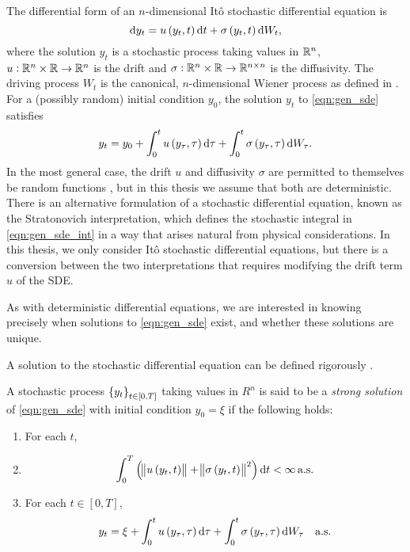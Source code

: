 The differential form of an \(n\)-dimensional It\^o stochastic differential equation is
\begin{equation}
	\dif y_t = u\left(y_t, t\right)\dif t + \sigma\left(y_t, t\right)\dif W_t,
	\label{eqn:gen_sde}
\end{equation}
where the solution \(y_t\) is a stochastic process taking values in \(\mathbb{R}^n\), \(u: \mathbb{R}^n \times \mathbb{R} \to \mathbb{R}^n\) is the drift and \(\sigma: \mathbb{R}^n \times \mathbb{R} \to \mathbb{R}^{n\times n}\) is the diffusivity.
The driving process \(W_t\) is the canonical, \(n\)-dimensional Wiener process as defined in .
For a (possibly random) initial condition \(y_0\), the solution \(y_t\) to \eqref{eqn:gen_sde} satisfies
\begin{equation}
	y_t = y_0 + \int_0^t{u\left(y_\tau, \tau\right)\dif\tau} + \int_0^t{\sigma\left(y_\tau, \tau\right)\dif W_\tau}.
	\label{eqn:gen_sde_int}
\end{equation}
In the most general case, the drift \(u\) and diffusivity \(\sigma\) are permitted to themselves be random functions \cite{KallianpurSundar_2014_StochasticAnalysisDiffusion}, but in this thesis we assume that both are deterministic.
There is an alternative formulation of a stochastic differential equation, known as the Stratonovich interpretation, which defines the stochastic integral in \eqref{eqn:gen_sde_int} in a way that arises natural from physical considerations. 
In this thesis, we only consider It\^o stochastic differential equations, but there is a conversion between the two interpretations that requires modifying the drift term \(u\) of the SDE. 

As with deterministic differential equations, we are interested in knowing precisely when solutions to \eqref{eqn:gen_sde} exist, and whether these solutions are unique.

A solution to the stochastic differential equation can be defined rigorously \cite{KallianpurSundar_2014_StochasticAnalysisDiffusion}.
\begin{definition}
	A stochastic process \(\set{y_t}_{t \in [0,T]}\) taking values in \(R^n\) is said to be a \emph{strong solution} of \eqref{eqn:gen_sde} with initial condition \(y_0 = \xi\) if the following holds:
	\begin{enumerate}
		\item For each \(t\),
		\item
		      \[
			      \int_0^T{\left(\norm{u\left(y_t, t\right)} + \norm{\sigma\left(y_t, t\right)}^2\right)\dif t} < \infty \alsu
		      \]

		\item For each \(t \in [0,T]\),
		      \[
			      y_t = \xi + \int_0^t{u\left(y_\tau, \tau\right)\dif\tau} + \int_0^t{\sigma\left(y_\tau, \tau\right)\dif W_\tau} \quad \text{a.s.}
		      \]
	\end{enumerate}
\end{definition}

